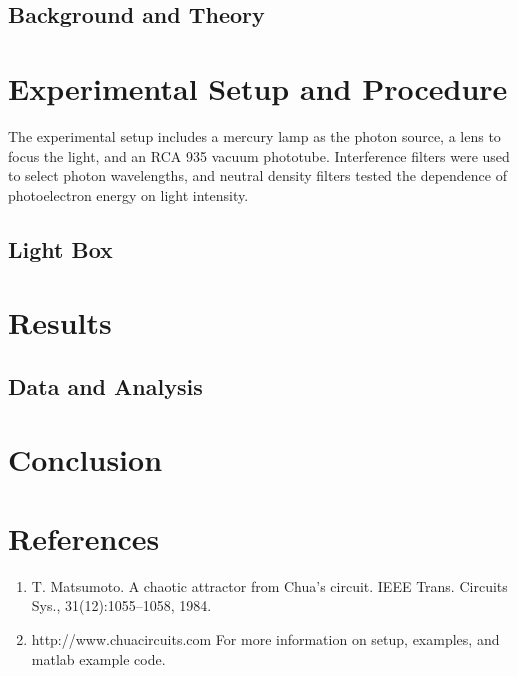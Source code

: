 \documentclass[12pt]{article}
\begin{document}
        \subsection{Background and Theory}



\section{Experimental Setup and Procedure}
        The experimental setup includes a mercury lamp as the photon source, a lens to focus the light, and an RCA 935 vacuum phototube. Interference filters were used to select photon wavelengths, and neutral density filters tested the dependence of photoelectron energy on light intensity.

        \subsection{Light Box}


\section{Results}
        \subsection{Data and Analysis}



\section{Conclusion}


\section{References}
    \begin{enumerate}
        \sloppy
        \item  T. Matsumoto. A chaotic attractor from Chua’s circuit. IEEE Trans. Circuits Sys., 31(12):1055–1058, 1984.
        \item  http://www.chuacircuits.com For more information on setup, examples, and matlab example code.

    \end{enumerate}
\end{document}
